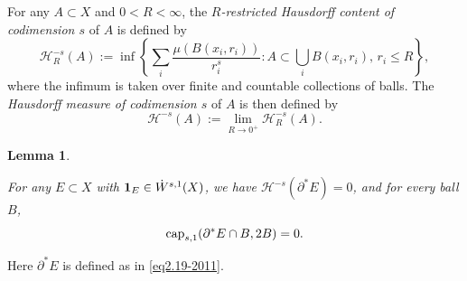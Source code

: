 \documentclass[11pt,leqno]{amsart}
\newtheorem{lemma}[theorem]{Lemma}
\numberwithin{equation}{section}
\theoremstyle{definition}
\begin{document}
	For any $A\subset X$ and $0<R<\infty$, the
	\emph{$R$-restricted Hausdorff content of codimension $s$} of $A$ is defined by
	\[
	\mathcal{H}^{-s}_R(A):=\inf{\left\{\sum_{i} \frac{\mu(B(x_i,r_i))}{r_i^s}: A\subset \bigcup_{i} B(x_i,r_i),\, r_i\leq R \right\}},
	\]
	where the infimum is taken over finite and countable collections of balls.
	The \emph{Hausdorff measure  of codimension $s$} of $A$ is then defined by
	\[
	\mathcal{H}^{-s}(A):=\lim_{R\to 0^+} \mathcal{H}^{-s}_R(A).
	\]
	
	\begin{lemma}\label{lem5.7-19nov}
		
		For any $E\subset X$ with ${\bf 1}_E\in \dot W^{s,1}(X)$, we have
		$\mathcal H^{-s}(\partial^*E)=0$, and for every ball $B$,
		\[
		{\rm cap}_{s,1}(\partial^*E\cap B, 2B)=0.
		\]
	\end{lemma}
	Here $\partial^*E$ is defined as in \eqref{eq2.19-2011}.
\end{document}
